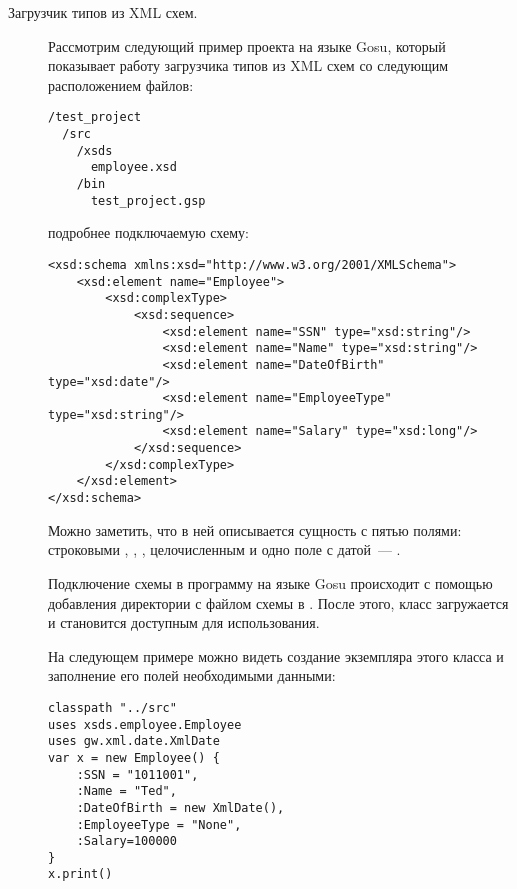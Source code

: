 \begin{description}
\item[Загрузчик типов из XML схем.] Рассмотрим следующий пример проекта на языке Gosu, который показывает работу загрузчика типов из XML схем со следующим расположением файлов:

\begin{code}\begin{lstlisting}[caption={Расположение файлов в примере загрузчиков типов на языке Gosu, использующее загрузку типов из XML схем.}, label=gosu-project-layout]
/test_project
  /src
    /xsds
      employee.xsd
    /bin
      test_project.gsp
\end{lstlisting}\end{code}

 подробнее подключаемую схему:

\begin{code}\begin{lstlisting}[caption={Содержимое файла \texttt{employee.xsd} из примера~\ref{gosu-project-layout}.}, label=gosu-employee-xsd]
<xsd:schema xmlns:xsd="http://www.w3.org/2001/XMLSchema">
    <xsd:element name="Employee">
        <xsd:complexType>
            <xsd:sequence>
                <xsd:element name="SSN" type="xsd:string"/>
                <xsd:element name="Name" type="xsd:string"/>
                <xsd:element name="DateOfBirth" type="xsd:date"/>
                <xsd:element name="EmployeeType" type="xsd:string"/>
                <xsd:element name="Salary" type="xsd:long"/>
            </xsd:sequence>
        </xsd:complexType>
    </xsd:element>
</xsd:schema>
\end{lstlisting}\end{code}

Можно заметить, что в ней описывается сущность  с пятью полями: строковыми
, , , целочисленным 
и одно поле с датой~--- .

Подключение схемы в программу на языке Gosu происходит с помощью добавления директории с файлом схемы в .
После этого, класс  загружается и становится доступным для использования.

На следующем примере можно видеть создание экземпляра этого класса и заполнение его полей необходимыми данными:

\begin{code}\begin{lstlisting}[caption={Содержимое файла \texttt{test\_project.gsp} из примера~\ref{gosu-project-layout}.}, label=gosu-xsd-loader]
classpath "../src"
uses xsds.employee.Employee
uses gw.xml.date.XmlDate
var x = new Employee() {
    :SSN = "1011001",
    :Name = "Ted",
    :DateOfBirth = new XmlDate(),
    :EmployeeType = "None",
    :Salary=100000
}
x.print()
\end{lstlisting}


\end{code}
\end{description}
